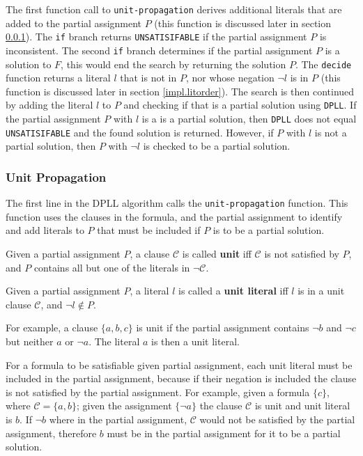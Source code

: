 The first function call to \texttt{unit-propagation} derives additional literals that are added to the partial assignment $P$ (this function is discussed later in section \ref{impl.unit}).
The \verb+if+ branch returns \texttt{UNSATISIFABLE} if the partial assignment $P$ is inconsistent.
The second \verb+if+ branch determines if the partial assignment $P$ is a solution to $F$, this would end the search by returning the solution $P$.
The \texttt{decide} function returns a literal $l$ that is not in $P$, nor whose negation $\neg l$ is in $P$ (this function is discussed later in section \ref{impl.litorder}).
The search is then continued by adding the literal $l$ to $P$ and checking if that is a partial solution using \texttt{DPLL}.
If the partial assignment $P$ with $l$ is a is a partial solution, then \texttt{DPLL} does not equal \texttt{UNSATISIFABLE} and the found solution is returned.
However, if $P$ with $l$ is not a partial solution, then $P$ with $\neg l$ is checked to be a partial solution.

\subsubsection{Unit Propagation}
\label{impl.unit}
The first line in the  DPLL algorithm calls the \texttt{unit-propagation} function.
This function uses the clauses in the formula, and the partial assignment to identify and add literals to $P$ that must be included if $P$ is to be a partial solution.

\begin{defs}
Given a partial assignment $P$, a clause $\mathcal{C}$ is called \textbf{unit} iff $\mathcal{C}$ is not satisfied by $P$, and $P$ contains all but one of the literals in $\neg \mathcal{C}$.
\end{defs}

\begin{defs}
Given a partial assignment $P$, a literal $l$ is called a \textbf{unit literal} iff $l$ is in a unit clause $\mathcal{C}$, and $\neg l \not \in P$.  
\end{defs}

For example, a clause $\{a,b,c\}$ is unit if the partial assignment contains $\neg b$ and $\neg c$ but neither $a$ or $\neg a$.
The literal $a$ is then a unit literal.

For a formula to be satisfiable given partial assignment, each unit literal must be included in the partial assignment,
because if their negation is included the clause is not satisfied by the partial assignment.
For example, given a formula $\{c\}$, where $\mathcal{C} = \{a,b\}$;
given the assignment $\{\neg a\}$ the clause $\mathcal{C}$ is unit and unit literal is $b$.
If $\neg b$ where in the partial assignment, $\mathcal{C}$ would not be satisfied by the partial assignment,
therefore $b$ must be in the partial assignment for it to be a partial solution.


